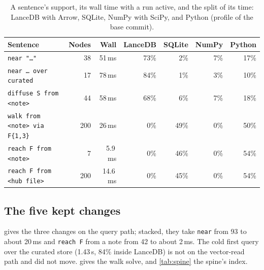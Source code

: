 \documentclass[11pt]{article}
\theoremstyle{plain}
\theoremstyle{definition}
\theoremstyle{remark}
\begin{document}
\begin{table}[ht]
\centering\small
\caption{A sentence's support, its wall time with a run active, and the split of its time:
LanceDB with Arrow, SQLite, NumPy with SciPy, and Python (profile of the base
commit).}\label{tab:pipeline}
\begin{tabular}{@{}lrrrrrr@{}}
\toprule
Sentence & Nodes & Wall & LanceDB & SQLite & NumPy & Python \\
\midrule
\texttt{near "\dots"} & 38 & 51\,ms & 73\% & 2\% & 7\% & 17\% \\
\texttt{near \dots\ over curated} & 17 & 78\,ms & 84\% & 1\% & 3\% & 10\% \\
\texttt{diffuse S from <note>} & 44 & 58\,ms & 68\% & 6\% & 7\% & 18\% \\
\texttt{walk from <note> via F\{1,3\}} & 200 & 26\,ms & 0\% & 49\% & 0\% & 50\% \\
\texttt{reach F from <note>} & 7 & 5.9\,ms & 0\% & 46\% & 0\% & 54\% \\
\texttt{reach F from <hub file>} & 200 & 14.6\,ms & 0\% & 45\% & 0\% & 54\% \\
\bottomrule
\end{tabular}
\end{table}

\subsection{The five kept changes}\label{sec:changes}
 gives the three changes on the query path; stacked, they take \texttt{near} from
93 to about 20\,ms and \texttt{reach F} from a note from 42 to about 2\,ms. The cold first query
over the curated store (1.43\,s, 84\% inside LanceDB) is not on the vector-read path and did not
move.  gives the walk solve, and \cref{tab:spine} the spine's index.
\end{document}
